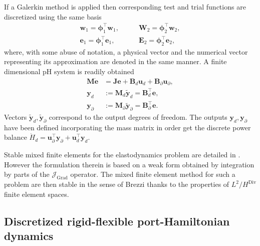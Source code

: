 \documentclass{svjour3}                     %
\DeclareMathOperator*{\Grad}{Grad}
\DeclareMathOperator*{\Div}{Div}
\begin{document}
If a Galerkin method is applied then corresponding test and trial functions are discretized using the same basis
\begin{equation*}
\begin{aligned}
\bm{w}_1 = \bm{\phi}_1^\top \bm{w}_1, \\
\bm{e}_1 = \bm{\phi}_1^\top \bm{e}_1, 
\end{aligned} \qquad
\begin{aligned}
\bm{W}_2 = \bm{\phi}_2^\top \bm{w}_2, \\
\bm{E}_2 = \bm{\phi}_2^\top \bm{e}_2,
\end{aligned}
\end{equation*}
where, with some abuse of notation, a physical vector and the numerical vector representing its approximation are denoted in the same manner. A finite dimensional pH system is readily obtained
\begin{equation}
\begin{aligned}
\bm{M} \dot{\bm{e}} &= \bm{J} \bm{e} + \bm{B}_d \bm{u}_d + \bm{B}_\partial \bm{u}_\partial, \\
\bm{y}_d &:= \bm{M}_d \widetilde{\bm{y}}_d = \bm{B}_d^\top \bm{e},  \\
\bm{y}_\partial &:= \bm{M}_\partial \widetilde{\bm{y}}_\partial = \bm{B}_\partial^\top \bm{e}.
\end{aligned}
\end{equation}
Vectors $\widetilde{\bm{y}}_d, \widetilde{\bm{y}}_\partial$ correspond to the output degrees of freedom. The outputs $\bm{y}_d, \bm{y}_\partial$ have been defined incorporating the mass matrix in order get the discrete power balance $\dot{H}_d = \bm{u}_\partial^\top \bm{y}_\partial + \bm{u}_d^\top \bm{y}_d$.

\begin{remark}
Stable mixed finite elements for the elastodynamics problem are detailed in \cite{ArnoldElasDyn}. However the formulation therein is based on a weak form obtained by integration by parts of the $\bm{\mathcal{J}}_{\Grad}$ operator. The mixed finite element method for such a problem are then stable in the sense of Brezzi thanks to the properties of $L^2 / H^{\Div}$ finite element spaces.
\end{remark}

\subsection{Discretized rigid-flexible port-Hamiltonian dynamics}
\end{document}
